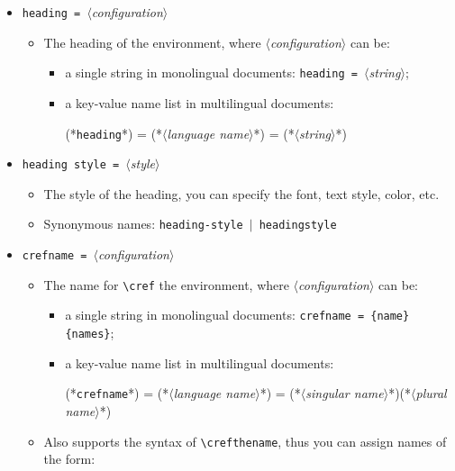 \documentclass[classical]{einfart}
\newcommand{\meta}[1]{$\langle${\normalfont\itshape#1}$\rangle$}
\newcommand{\commandoption}[1]{\texttt{\textcolor{code-keys}{#1}}}
\begin{document}
\begin{itemize}[label=,leftmargin=1.25em,itemindent=-1.25em]
    \item \commandoption{heading}\lstinline| = |\meta{configuration}
        \begin{itemize}
            \item The heading of the environment, where \meta{configuration} can be:
            \begin{itemize}
                \item a single string in monolingual documents: \commandoption{heading}\lstinline| = |\meta{string};
                \item a key-value name list in multilingual documents:
\begin{code}
(*\commandoption{heading}*) = {
    (*\meta{language name}*) = (*\meta{string}*)
}
\end{code}
            \end{itemize}
        \end{itemize}
    \item \commandoption{heading style}\lstinline| = |\meta{style}
        \begin{itemize}
            \item The style of the heading, you can specify the font, text style, color, etc.
            \item Synonymous names: \commandoption{heading-style} \,$|$\, \commandoption{headingstyle}
        \end{itemize}
    \item \commandoption{crefname}\lstinline| = |\meta{configuration}
        \begin{itemize}
            \item The name for \lstinline|\cref| the environment, where \meta{configuration} can be:
            \begin{itemize}
                \item a single string in monolingual documents: \commandoption{crefname}\lstinline| = {name}{names}|;
                \item a key-value name list in multilingual documents:
\begin{code}
(*\commandoption{crefname}*) = {
    (*\meta{language name}*) = {(*\meta{singular name}*)}{(*\meta{plural name}*)}
}
\end{code}
            \end{itemize}
            \item Also supports the syntax of \lstinline|\crefthename|, thus you can assign names of the form:

\end{itemize}
\end{itemize}
\end{document}
